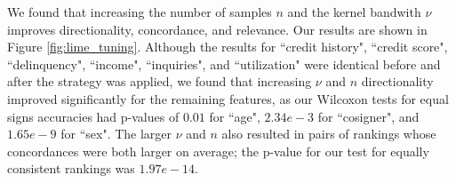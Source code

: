 \documentclass[mnsc,blindrev]{informs3}
\begin{document}
            We found that increasing the number of samples $n$ and the kernel bandwith $\nu$ improves directionality, concordance, and relevance. Our results are shown in Figure \ref{fig:lime_tuning}. Although the results for ``credit history", ``credit score", ``delinquency", ``income", ``inquiries", and ``utilization" were identical before and after the strategy was applied, we found that increasing $\nu$ and $n$ directionality improved significantly for the remaining features, as our Wilcoxon tests for equal signs accuracies had p-values of $0.01$ for ``age", $2.34e-3$ for ``cosigner", and $1.65e-9$ for ``sex". The larger $\nu$ and $n$ also resulted in pairs of rankings whose concordances were both larger on average; the p-value for our test for equally consistent rankings was $1.97e-14$. %
        
\end{document}
